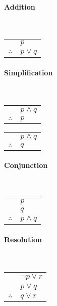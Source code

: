 \documentclass[a4paper, 10pt]{article}
\begin{document}
\begin{multicols}{3}
\paragraph{Addition}\mbox{}\\
\begin{tabular}{c@{\,}l@{}}
                & \(p\) \\\cline{2-2}
\(\therefore\)  & \(p\lor q\)
\end{tabular}

\paragraph{Simplification}\mbox{}\\
\begin{tabular}{c@{\,}l@{}}
                & \(p\land q\) \\\cline{2-2}
\(\therefore\)  & \(p\)
\end{tabular}
\begin{tabular}{c@{\,}l@{}}
                & \(p\land q\) \\\cline{2-2}
\(\therefore\)  & \(q\)
\end{tabular}

\paragraph{Conjunction}\mbox{}\\
\begin{tabular}{c@{\,}l@{}}
                & \(p\) \\
                & \(q\) \\\cline{2-2}
\(\therefore\)  & \(p\land q\)
\end{tabular}

\paragraph{Resolution}\mbox{}\\
\begin{tabular}{c@{\,}l@{}}
                & \(\neg p\lor r\) \\
                & \(p\lor q\) \\\cline{2-2}
\(\therefore\)  & \(q\lor r\)
\end{tabular}


\end{multicols}
\end{document}
